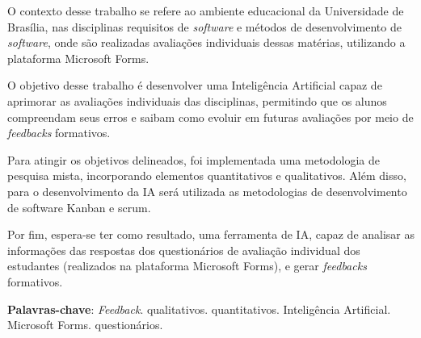 \begin{resumo}

    O contexto desse trabalho se refere ao ambiente educacional da Universidade de Brasília, nas disciplinas requisitos de \textit{software} e métodos de desenvolvimento de \textit{software}, onde são realizadas avaliações individuais dessas matérias, utilizando a plataforma Microsoft Forms. 

    O objetivo desse trabalho é desenvolver uma Inteligência Artificial capaz de aprimorar as avaliações individuais das disciplinas, permitindo que os alunos compreendam seus erros e saibam como evoluir em futuras avaliações por meio de \textit{feedbacks} formativos.

    Para atingir os objetivos delineados, foi implementada uma metodologia de pesquisa mista, incorporando elementos quantitativos e qualitativos. Além disso, para o desenvolvimento da IA será utilizada as metodologias de desenvolvimento de software Kanban e scrum.

    Por fim, espera-se ter como resultado, uma ferramenta de IA, capaz de analisar as informações das respostas dos questionários de avaliação individual dos estudantes (realizados na plataforma Microsoft Forms), e gerar \textit{feedbacks} formativos.

 \vspace{\onelineskip}
    
 \noindent
 \textbf{Palavras-chave}: \textit{Feedback}. qualitativos. quantitativos. Inteligência Artificial. Microsoft Forms. questionários. 
\end{resumo}
